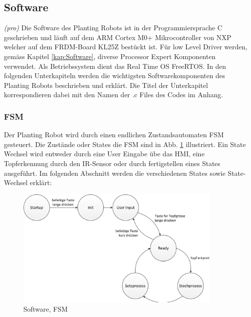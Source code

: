 \subsection{Software} \label{sec:Software}
\textit{(pro)} Die Software des Planting Robots ist in der Programmiersprache C geschrieben und läuft auf dem ARM Cortex M0+ Mikrocontroller von NXP welcher auf dem FRDM-Board KL25Z bestückt ist. Für low Level Driver werden, gemäss Kapitel \ref{kap:Software}, diverse Processor Expert Komponenten verwendet. Als Betriebssystem dient das Real Time OS FreeRTOS. In den folgenden Unterkapiteln werden die wichtigsten Softwarekomponenten des Planting Robots beschrieben und erklärt. Die Titel der Unterkapitel korrespondieren dabei mit den Namen der .c Files des Codes im Anhang.

\subsubsection{FSM} \label{sec:FSM}
Der Planting Robot wird durch einen endlichen Zustandsautomaten FSM gesteuert. Die Zustände oder States die FSM sind in Abb. \ref{fig:FSM} illustriert. Ein State Wechsel wird entweder durch eine User Eingabe übe das HMI, eine Topferkennung durch den IR-Sensor oder durch fertigstellen eines States ausgeführt. Im folgenden Abschnitt werden die verschiedenen States sowie State-Wechsel erklärt:

\begin{figure}[H]
	\includegraphics[width=0.9\textwidth]{Illustrationen/6-Umsetzung/FSM_B&W_breit.png}
	\caption{Software, FSM}
	\label{fig:FSM}
\end{figure}

